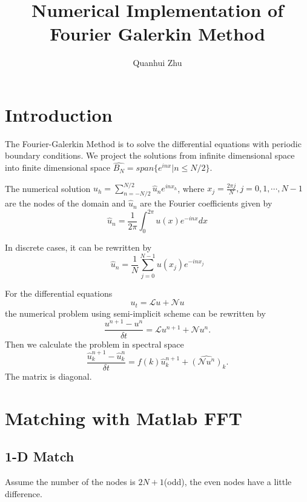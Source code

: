 \documentclass[a4paper]{article}
\title{Numerical Implementation of Fourier Galerkin Method}
\author{Quanhui Zhu}
\begin{document}
\maketitle

\section{Introduction}

The Fourier-Galerkin Method is to solve the differential equations with periodic boundary conditions. We project the solutions from infinite dimensional space into finite dimensional space $\hat{B_N}=span\{e^{inx}|n\le N/2\}$.

The numerical solution $u_h=\sum\limits_{n=-N/2}^{N/2}\hat{u}_ne^{inx_h}$,  where $x_j=\frac{2\pi j}{N}, j=0,1,\cdots,N-1$ are the nodes of the domain
and $\hat{u}_n$ are the Fourier coefficients given by
\begin{equation}
    \hat{u}_n=\frac{1}{2\pi}\int_0^{2\pi}u(x)e^{-inx}dx
    \label{eq::coefficient}
\end{equation}

In discrete cases, it can be rewritten by 
\begin{equation}
    \hat{u}_n=\frac{1}{N}\sum\limits_{j=0}^{N-1}u(x_j)e^{-inx_j}
    \label{eq::hatu}
\end{equation}

For the differential equations 
\begin{equation}
    u_t=\mathcal{L}u+\mathcal{N}u
    \label{problem}
\end{equation} 
the numerical problem using semi-implicit scheme can be rewritten by 
\begin{equation}
    \frac{u^{n+1}-u^n}{\delta t}=\mathcal{L}u^{n+1}+\mathcal{N}u^n.
\end{equation}
Then we calculate the problem in spectral space
\begin{equation}
     \frac{\hat{u}_k^{n+1}-\hat{u}_k^n}{\delta t}=f(k)\hat{u}_k^{n+1}+\hat{(\mathcal{N}u^n)}_k.
     \label{eq::time_scheme}
\end{equation}
The matrix is diagonal.

\section{Matching with Matlab FFT}
\subsection{1-D Match}
Assume the number of the nodes is $2N+1$(odd), the even nodes have a little difference.
\end{document}
